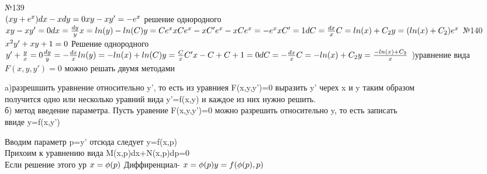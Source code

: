 \documentclass[a4paper]{article}
\begin{document}
    №139\\
    $(xy+e^x)dx-xdy=0\\
    xy-xy'=-e^x\\$
    решение однородного\\
    $xy-xy'=0\\
    dx=\frac{dy}{y}\\
    x=ln(y)-ln(C)\\
    y=Ce^x\\
    xCe^x-xC'e^x-xCe^x=-e^x\\
    xC'=1\\
    dC=\frac{dx}{x}\\
    C=ln(x)+C_2\\
    y=(ln(x)+C_2)e^x\\$
    №140\\
    $x^2y'+xy+1=0\\$
    Решение однородного\\
    $y'+\frac{y}{x}=0\\
    \frac{dy}{y}=-\frac{dx}{x}\\
    ln(y)=-ln(x)+ln(C)\\
    y=\frac{C}{x}\\
    C'x-C+C+1=0\\
    dC=-\frac{dx}{x}\\
    C=-ln(x)+C_2\\
    y=\frac{-ln(x)+C_2}{x}\\$
    )уравнение вида $F(x,y,y')=0$ можно решать двумя методами\\
    \begin{tabbing}
        a)разрешшить уравнение относительно y', то есть из уравниея F(x,y,y')=0 выразить y' черех x и y
        таким образом\\
        получится одно или несколько уравний вида y'=f(x,y) и каждое из них нужно решить.\\
        б) метод введение параметра. Пусть уравение F(x,y,y')=0 можно разрешить относительно y, то есть записать
        \\ввиде y=f(x,y')\\
    \end{tabbing}
    Вводим параметр p=y' отсюда следует y=f(x,p)\\
    Прихоим к уравнению вида M(x,p)dx+N(x,p)dp=0\\
    Если решение этого ур $x=\phi(p)\\$    
    Диффиренциал-
    $x=\phi(p)\\
    y=f(\phi(p),p)\\$
\end{document}
